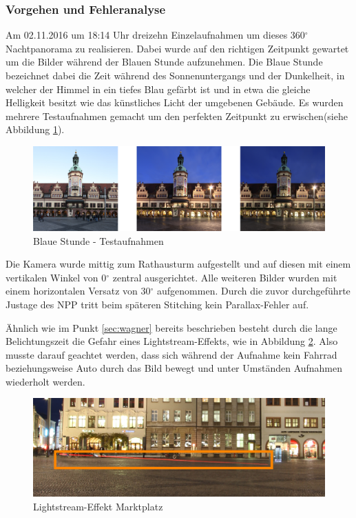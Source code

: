 \documentclass[liststotoc,bibtotoc,fontsize=14pt,]{scrreprt}
\begin{document}
		\subsubsection{Vorgehen und Fehleranalyse}
		Am 02.11.2016 um 18:14 Uhr dreizehn Einzelaufnahmen um dieses 360$^\circ$ Nachtpanorama zu realisieren. Dabei wurde auf den richtigen Zeitpunkt gewartet um die Bilder während der Blauen Stunde aufzunehmen. Die Blaue Stunde bezeichnet dabei die Zeit während des Sonnenuntergangs und der Dunkelheit, in welcher der Himmel in ein tiefes Blau gefärbt ist und in etwa die gleiche Helligkeit besitzt wie das  künstliches Licht der umgebenen Gebäude. Es wurden mehrere Testaufnahmen gemacht um den perfekten Zeitpunkt zu erwischen(siehe Abbildung \ref{img:bs}).
		
		\begin{figure}[H]
			\includegraphics[width=\linewidth]{img/bs.jpg}
			\caption{Blaue Stunde - Testaufnahmen}
			\label{img:bs}
		\end{figure}
		
		Die Kamera wurde mittig zum Rathausturm aufgestellt und auf diesen mit einem vertikalen Winkel von 0$^\circ$ zentral ausgerichtet. Alle weiteren Bilder wurden mit einem horizontalen Versatz von 30$^\circ$ aufgenommen. Durch die zuvor durchgeführte Justage des NPP tritt beim späteren Stitching kein Parallax-Fehler auf. 
		
		\bigskip
		Ähnlich wie im Punkt \ref{sec:wagner} bereits beschrieben besteht durch die lange Belichtungszeit die Gefahr eines Lightstream-Effekts, wie in Abbildung \ref{img:ls-m}. Also musste darauf geachtet werden, dass sich während der Aufnahme kein Fahrrad beziehungsweise Auto durch das Bild bewegt und unter Umständen Aufnahmen wiederholt werden. 

		\begin{figure}[H]
			\includegraphics[width=\linewidth]{img/ls-m.jpg}
			\caption{Lightstream-Effekt Marktplatz}
			\label{img:ls-m}
		\end{figure}
\end{document}
